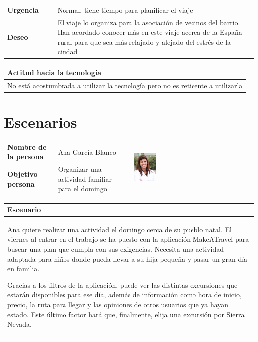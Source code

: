 \documentclass[11pt]{article}
\begin{document}
\begin{table}[H]
	\begin{tabular}{p{0.2\linewidth}|p{0.8\linewidth}}
		\toprule
		\textbf{Urgencia} & Normal, tiene tiempo para planificar el viaje\\
		\textbf{Deseo}  & El viaje lo organiza para la asociación de vecinos del barrio. Han acordado conocer más en este viaje acerca de la España rural para que sea más relajado y alejado del estrés de la ciudad\\
		\bottomrule
	\end{tabular}
	
	\begin{tabular}{p{1.028\linewidth}}
		\textbf{Actitud hacia la tecnología}\\
		\midrule
		No está acostumbrada a utilizar la tecnología pero no es reticente a utilizarla
	\end{tabular}
\end{table}


\newpage
\section{Escenarios}

\begin{table}[H]
  \centering
  \begin{tabular}{p{0.2\linewidth}|p{0.3\linewidth}p{0.475\linewidth}}
    \toprule
    \textbf{Nombre de la persona} & Ana García Blanco &\multirow{2}{*}{\begin{minipage}{1.\textwidth}\includegraphics[width=0.2\textwidth, height=25mm]{Ana}\end{minipage}}\\
    \textbf{Objetivo persona} & Organizar una actividad familiar para el domingo & \\
    \bottomrule
  \end{tabular}

\begin{tabular}{p{1.028\linewidth}}
  \textbf{Escenario}\\
  \midrule  
  Ana quiere realizar una actividad el domingo cerca de su pueblo natal. El viernes al entrar en el trabajo se ha puesto con la aplicación MakeATravel para buscar una plan que cumpla con sus exigencias.
Necesita una actividad adaptada para niños donde pueda llevar a su hija pequeña y pasar un gran día en familia.

Gracias a los filtros de la aplicación, puede ver las distintas excursiones que estarán disponibles para ese día, además de información como hora de inicio, precio, la ruta para llegar y las opiniones de otros usuarios que ya hayan estado. Este último factor hará que, finalmente, elija una excursión por Sierra Nevada.

\end{tabular}
\end{table}
\end{document}
